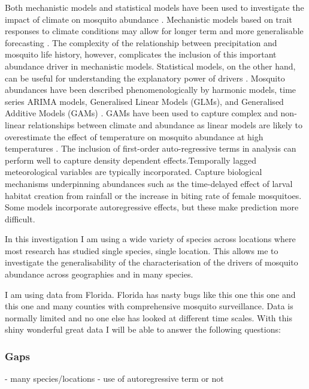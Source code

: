 Both mechanistic models and statistical models have been used to investigate the impact of climate on mosquito abundance \citep{Ahumada2004, Cailly2012, Yoo2016, Wang2011}. Mechanistic models based on trait responses to climate conditions may allow for longer term and more generalisable forecasting \citep{Cator2020}. The complexity of the relationship between precipitation and mosquito life history, however, complicates the inclusion of this important abundance driver in mechanistic models. Statistical models, on the other hand, can be useful for understanding the explanatory power of drivers \citep{Mordecai2019}. Mosquito abundances have been described phenomenologically by harmonic models, time series ARIMA models, Generalised Linear Models (GLMs), and Generalised Additive Models (GAMs) \citep{Li2019, Trawinski2008, Wang2011, Yoo2016}. GAMs have been used to capture complex and non-linear relationships between climate and abundance as linear models are likely to overestimate the effect of temperature on mosquito abundance at high temperatures \citep{Li2019, Roiz2014, Xu2017}. The inclusion of first-order auto-regressive terms in analysis can perform well to capture density dependent effects.Temporally lagged meteorological variables are typically incorporated. Capture biological mechanisms underpinning abundances such as the time-delayed effect of larval habitat creation from rainfall or the increase in biting rate of female mosquitoes. Some models incorporate autoregressive effects, but these make prediction more difficult.
	
In this investigation I am using a wide variety of species across locations where most research has studied single species, single location. This allows me to investigate the generalisability of the characterisation of the drivers of mosquito abundance across geographies and in many species.

I am using data from Florida. Florida has nasty bugs like this one this one and this one and many counties with comprehensive mosquito surveillance. Data is normally limited and no one else has looked at different time scales. With this shiny wonderful great data I will be able to answer the following questions:

\subsubsection{Gaps}
- many species/locations
- use of autoregressive term or not

